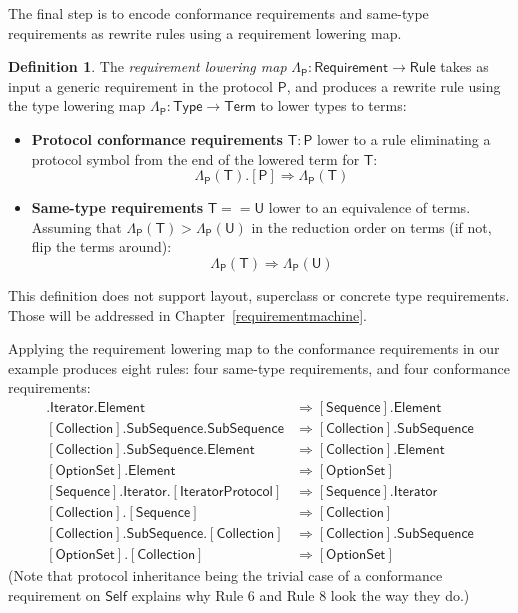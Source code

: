 \documentclass[headsepline,bibliography=totoc]{scrreport}
\newcommand{\namesym}[1]{\mathsf{#1}}
\newcommand{\genericparam}[1]{\bm{\mathsf{#1}}}
\newcommand{\proto}[1]{\bm{\mathsf{#1}}}
\newcommand{\protosym}[1]{[\proto{#1}]}
\theoremstyle{definition}
\theoremstyle{definition}
\newtheorem{definition}{Definition}[chapter]
\theoremstyle{definition}
\begin{document}
The final step is to encode conformance requirements and same-type requirements as rewrite rules using a requirement lowering map.
\begin{definition}\label{reqlowering1} The \emph{requirement lowering map} $\Lambda_{\proto{P}}\colon\namesym{Requirement}\rightarrow\namesym{Rule}$ takes as input a generic requirement in the protocol $\proto{P}$, and produces a rewrite rule using the type lowering map $\Lambda_{\proto{P}}\colon\namesym{Type}\rightarrow\namesym{Term}$ to lower types to terms:
\begin{itemize}
\item \textbf{Protocol conformance requirements} $\namesym{T}\colon\proto{P}$ lower to a rule eliminating a protocol symbol from the end of the lowered term for $\namesym{T}$:
\[\Lambda_{\proto{P}}(\namesym{T}).\protosym{P} \Rightarrow \Lambda_{\proto{P}}(\namesym{T})\]
\item \textbf{Same-type requirements} $\namesym{T}==\namesym{U}$ lower to an equivalence of terms. Assuming that $\Lambda_{\proto{P}}(\namesym{T}) > \Lambda_{\proto{P}}(\namesym{U})$ in the reduction order on terms (if not, flip the terms around):
\[\Lambda_{\proto{P}}(\namesym{T}) \Rightarrow \Lambda_{\proto{P}}(\namesym{U})\]
\end{itemize}
This definition does not support layout, superclass or concrete type requirements. Those will be addressed in Chapter~\ref{requirementmachine}.
\end{definition}
Applying the requirement lowering map to the conformance requirements in our example produces eight rules: four same-type requirements, and four conformance requirements:
\begin{align}
\protosym{Sequence}.\namesym{Iterator}.\namesym{Element} &\Rightarrow \protosym{Sequence}.\namesym{Element}\tag{1}\\
\protosym{Collection}.\namesym{SubSequence}.\namesym{SubSequence} &\Rightarrow \protosym{Collection}.\namesym{SubSequence}\tag{2}\\
\protosym{Collection}.\namesym{SubSequence}.\namesym{Element} &\Rightarrow \protosym{Collection}.\namesym{Element}\tag{3}\\
\protosym{OptionSet}.\namesym{Element} &\Rightarrow \protosym{OptionSet}\tag{4}\\
\protosym{Sequence}.\namesym{Iterator}.\protosym{IteratorProtocol} &\Rightarrow \protosym{Sequence}.\namesym{Iterator}\tag{5}\\
\protosym{Collection}.\protosym{Sequence} &\Rightarrow \protosym{Collection}\tag{6}\\
\protosym{Collection}.\namesym{SubSequence}.\protosym{Collection} &\Rightarrow \protosym{Collection}.\namesym{SubSequence}\tag{7}\\
\protosym{OptionSet}.\protosym{Collection} &\Rightarrow \protosym{OptionSet}\tag{8}
\end{align}
(Note that protocol inheritance being the trivial case of a conformance requirement on $\genericparam{Self}$ explains why Rule 6 and Rule 8 look the way they do.)
\end{document}
